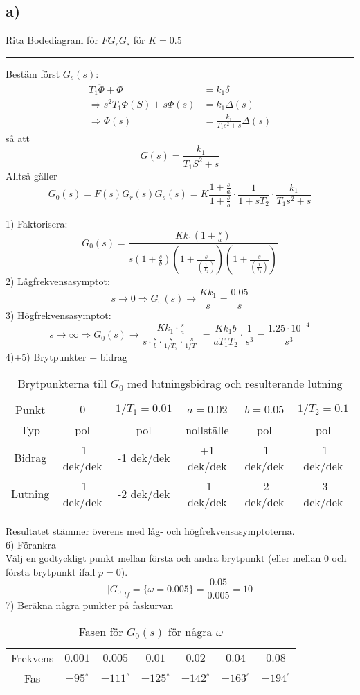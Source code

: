 \documentclass[12pt]{article}
\newcommand{\qline}{\hrule \vspace*{10pt}}
\begin{document}
\subsection*{a)}
Rita Bodediagram för $FG_rG_s$ för $K = 0.5$
\qline
Bestäm först $G_s(s)$:
\begin{align*}
  T_1 \ddot{\Phi} + \dot{\Phi} &= k_1 \delta \\
  \Rightarrow s^2 T_1 \Phi(S) + s \Phi(s) &= k_1 \Delta(s) \\
  \Rightarrow \Phi(s) &= \frac{k_1}{T_1s^2+s}\Delta(s)
\end{align*}
så att 
\[G(s) = \frac{k_1}{T_1 S^2 +s}\]
Alltså gäller 
\[G_0(s) = F(s)G_r(s)G_s(s) = K\frac{1+\frac{s}{a}}{1+\frac{s}{b}} \cdot \frac{1}{1+sT_2} \cdot \frac{k_1}{T_1 s^2+s}\]

1) Faktorisera:
\[G_0(s) = \frac{Kk_1 (1+\frac{s}{a})}{s(1+\frac{s}{b})\left(1+\frac{s}{(\frac{1}{T_2})}\right)\left(1+\frac{s}{(\frac{1}{T_1})}\right)}\]
2) Lågfrekvensasymptot: 
\[s \to 0 \Rightarrow G_0(s) \to \frac{Kk_1}{s} = \frac{0.05}{s}\]
3) Högfrekvensasymptot: 
\[s \to \infty \Rightarrow G_0(s) \to \frac{Kk_1 \cdot \frac{s}{a} }{s \cdot \frac{s}{b} \cdot \frac{s}{1/T_2} \cdot \frac{s}{1/T_1}} = \frac{Kk_1b}{aT_1T_2} \cdot \frac{1}{s^3} = \frac{1.25 \cdot 10^{-4}}{s^3}\]
4)+5) Brytpunkter + bidrag 
\begin{table}[htbp]
  \centering
  \begin{tabular}{c|c|c|c|c|c}
 Punkt & $0$ & $1/T_1=0.01$ & $a=0.02$ & $b=0.05$ & $1/T_2=0.1$ \\
 Typ & pol & pol & nollställe & pol & pol \\
 Bidrag & -1 dek/dek & -1 dek/dek & +1 dek/dek & -1 dek/dek & -1 dek/dek \\
 Lutning & -1 dek/dek & -2 dek/dek & -1 dek/dek & -2 dek/dek & -3 dek/dek 
  \end{tabular}
  \caption{Brytpunkterna till $G_0$ med lutningsbidrag och resulterande lutning}
  \label{tab:brytbidr}
\end{table}
\FloatBarrier
Resultatet stämmer överens med låg- och högfrekvensasymptoterna. \\
6) Förankra \\
Välj en godtyckligt punkt mellan första och andra brytpunkt (eller mellan 0 och första brytpunkt ifall $p = 0$). 
\[|G_0|_{lf} = \lbrace \omega = 0.005 \rbrace = \frac{0.05}{0.005} = 10\]
7) Beräkna några punkter på faskurvan
\begin{table}[htbp]
  \centering
  \begin{tabular}{c|c|c|c|c|c|c}
 Frekvens & $0.001$ & $0.005$ & $0.01$ & $0.02$ & $0.04$ & $0.08$ \\
 Fas & $-95 ^{\circ}$ & $-111 ^{\circ}$ & $-125 ^{\circ}$ & $-142 ^{\circ}$ & $-163 ^{\circ}$ & $-194^{\circ}$
  \end{tabular}
  \caption{Fasen för $G_0(s)$ för några $\omega$}
  \label{tab:fas}
\end{table}
\end{document}

